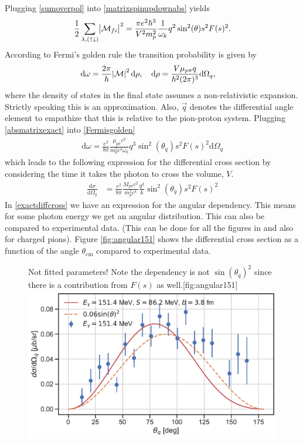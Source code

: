 Plugging \eqref{sumoverpol} into \eqref{matrixspinupdownabs} yields
\begin{equation} \label{absmatrixexact}
    \frac{1}{2}\sum_{\lambda,(\uparrow\downarrow)} \abs{\mathcal{M}_{fi}}^2 = \frac{\pi e^2\hbar^3}{V^2 m_p^2}\frac{1}{\omega_k} q^2\sin^2(\theta) s^2 F(s)^2.
\end{equation}
According to Fermi's golden rule the transition probability is given by
\begin{align}\label{Fermisgolden}
    \text{d}\omega &= \frac{2\pi}{\hbar}\abs{\mathcal{M}}^2\text{d}\rho, \quad \text{d}\rho = \frac{V \mu_{p\pi }q}{\hbar^2(2\pi)^3}\text{d}\Omega_q,
\end{align}
where the density of states in the final state assumes a non-relativistic expansion. Strictly speaking this is an approximation. Also, $\vec{q}$ denotes the differential angle element to empathize that this is relative to the pion-proton system. Plugging \eqref{absmatrixexact} into \eqref{Fermisgolden}
\begin{align}
    \text{d}\omega = \frac{e^2}{8\pi}\frac{\mu_{p\pi }c^2}{m_p^2 c^4 \omega_k}q^3 \sin^2(\theta_q) s^2 F(s)^2 \text{d}\Omega_q
\end{align}
which leads to the following expression for the differential cross section by considering the time it takes the photon to cross the volume, $V$.
\begin{align}\label{exactdiffcross}
    \frac{\text{d}\sigma}{\text{d}\Omega_q} &= \frac{e^2}{8\pi}\frac{M_{p\pi}c^2}{m_p^2c^4}\frac{q^3}{k}\sin^2(\theta_q) s^2 F(s)^2
\end{align}
In \eqref{exactdiffcross} we have an expression for the angular dependency. This means for some photon energy we get an angular distribution. This can also be compared to experimental data. (This can be done for all the figures in \cite[]{Beck_1990} and also for charged pions). Figure \ref{fig:angular151} shows the differential cross section as a function of the angle $\theta_{\text{cm}}$ compared to experimental data.  
\begin{figure}[H]
    \begin{sidecaption}{Not fitted parameters! Note the dependency is not $\sin(\theta_q)^2$ since there is a contribution from $F(s)$ as well.}[fig:angular151]
    \includegraphics[width=\linewidth]{Figures/DiffCross151.pdf}
    \end{sidecaption}
\end{figure}

